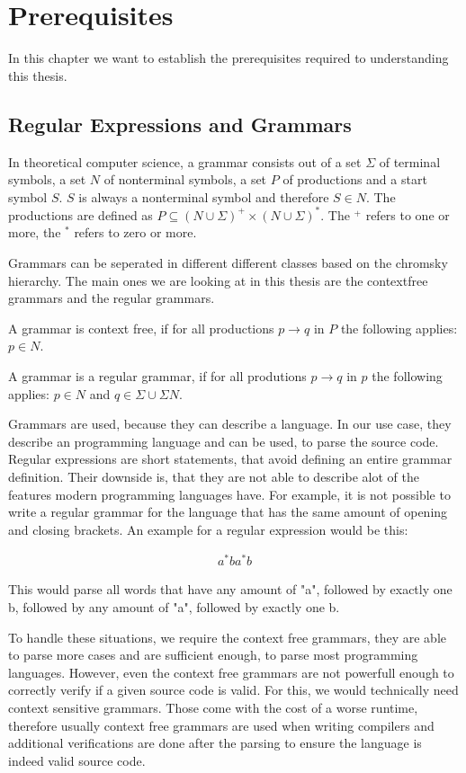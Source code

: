 \section{Prerequisites}

In this chapter we want to establish the prerequisites required to understanding this thesis.

\subsection{Regular Expressions and Grammars}

In theoretical computer science, a grammar consists out of a set $\Sigma$ of terminal symbols, a set $N$ of nonterminal symbols, a set $P$ of productions and a start symbol $S$. $S$ is always a nonterminal symbol and therefore $S \in N$. The productions are defined as $P \subseteq (N \cup \Sigma)^+ \times (N \cup \Sigma)^*$. The $^+$ refers to one or more, the $^*$ refers to zero or more.

Grammars can be seperated in different different classes based on the chromsky hierarchy. The main ones we are looking at in this thesis are the contextfree grammars and the regular grammars.

A grammar is context free, if for all productions $p \to q$ in $P$ the following applies: $p \in N$.

A grammar is a regular grammar, if for all produtions $p \to q$ in $p$ the following applies: $p \in N$ and $q \in \Sigma \cup \Sigma N$.

Grammars are used, because they can describe a language. In our use case, they describe an programming language and can be used, to parse the source code. Regular expressions are short statements, that avoid defining an entire grammar definition. Their downside is, that they are not able to describe alot of the features modern programming languages have. For example, it is not possible to write a regular grammar for the language that has the same amount of opening and closing brackets. An example for a regular expression would be this:

\begin{align*}
a^*ba^*b
\end{align*}

This would parse all words that have any amount of "a", followed by exactly one b, followed by any amount of "a", followed by exactly one b.

To handle these situations, we require the context free grammars, they are able to parse more cases and are sufficient enough, to parse most programming languages. However, even the context free grammars are not powerfull enough to correctly verify if a given source code is valid. For this, we would technically need context sensitive grammars. Those come with the cost of a worse runtime, therefore usually context free grammars are used when writing compilers and additional verifications are done after the parsing to ensure the language is indeed valid source code.

